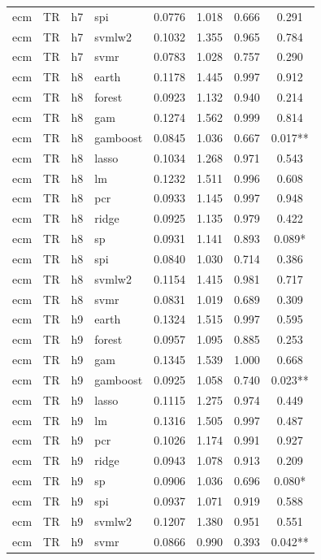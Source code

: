 \begin{ThreePartTable}
\begin{longtable}[t]{llclcccc}
ecm & TR & h7 & spi & 0.0776 & 1.018 & 0.666 & 0.291\\
ecm & TR & h7 & svmlw2 & 0.1032 & 1.355 & 0.965 & 0.784\\
ecm & TR & h7 & svmr & 0.0783 & 1.028 & 0.757 & 0.290\\
\addlinespace
ecm & TR & h8 & earth & 0.1178 & 1.445 & 0.997 & 0.912\\
ecm & TR & h8 & forest & 0.0923 & 1.132 & 0.940 & 0.214\\
ecm & TR & h8 & gam & 0.1274 & 1.562 & 0.999 & 0.814\\
ecm & TR & h8 & gamboost & 0.0845 & 1.036 & 0.667 & 0.017**\\
ecm & TR & h8 & lasso & 0.1034 & 1.268 & 0.971 & 0.543\\
ecm & TR & h8 & lm & 0.1232 & 1.511 & 0.996 & 0.608\\
ecm & TR & h8 & pcr & 0.0933 & 1.145 & 0.997 & 0.948\\
ecm & TR & h8 & ridge & 0.0925 & 1.135 & 0.979 & 0.422\\
ecm & TR & h8 & sp & 0.0931 & 1.141 & 0.893 & 0.089*\\
ecm & TR & h8 & spi & 0.0840 & 1.030 & 0.714 & 0.386\\
ecm & TR & h8 & svmlw2 & 0.1154 & 1.415 & 0.981 & 0.717\\
ecm & TR & h8 & svmr & 0.0831 & 1.019 & 0.689 & 0.309\\
\addlinespace
ecm & TR & h9 & earth & 0.1324 & 1.515 & 0.997 & 0.595\\
ecm & TR & h9 & forest & 0.0957 & 1.095 & 0.885 & 0.253\\
ecm & TR & h9 & gam & 0.1345 & 1.539 & 1.000 & 0.668\\
ecm & TR & h9 & gamboost & 0.0925 & 1.058 & 0.740 & 0.023**\\
ecm & TR & h9 & lasso & 0.1115 & 1.275 & 0.974 & 0.449\\
ecm & TR & h9 & lm & 0.1316 & 1.505 & 0.997 & 0.487\\
ecm & TR & h9 & pcr & 0.1026 & 1.174 & 0.991 & 0.927\\
ecm & TR & h9 & ridge & 0.0943 & 1.078 & 0.913 & 0.209\\
ecm & TR & h9 & sp & 0.0906 & 1.036 & 0.696 & 0.080*\\
ecm & TR & h9 & spi & 0.0937 & 1.071 & 0.919 & 0.588\\
ecm & TR & h9 & svmlw2 & 0.1207 & 1.380 & 0.951 & 0.551\\
ecm & TR & h9 & svmr & 0.0866 & 0.990 & 0.393 & 0.042**\\

\end{longtable}
\end{ThreePartTable}
